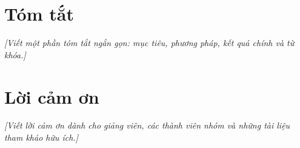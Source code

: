 \newpage
\section*{Tóm tắt}
\textit{[Viết một phần tóm tắt ngắn gọn: mục tiêu, phương pháp, kết quả chính và từ khóa.]}

\newpage
\section*{Lời cảm ơn}
\textit{[Viết lời cảm ơn dành cho giảng viên, các thành viên nhóm và những tài liệu tham khảo hữu ích.]}

\newpage
\listoffigures

\newpage
\listoftables